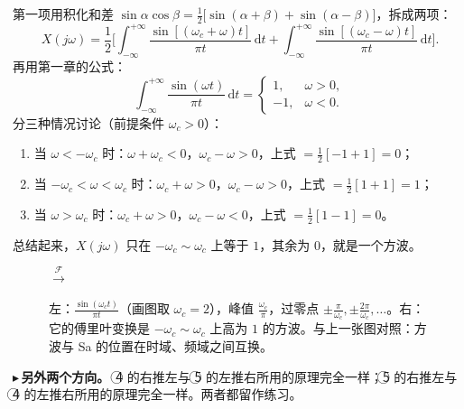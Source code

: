 \documentclass[UTF8,a4paper,11pt]{ctexart}
\newcommand{\dd}{\mathrm{d}}
\newcommand{\F}{\mathcal{F}}
\newcommand{\taxes}[5][t]{%
  \draw[->] (#2,0) -- (#3,0) node[right,font=\scriptsize] {$#1$};
  \draw[->] (0,#5) -- (0,#4);
  \node[anchor=north east,font=\tiny,gray!60!black,inner sep=1pt] at (0,-0.02) {$0$};}
\newcommand{\xt}[2]{\draw (#1,0) -- (#1,-0.1) node[anchor=north,font=\tiny,gray!60!black,fill=white,inner sep=0.6pt] {$#2$};}
\newcommand{\yt}[2]{\draw (0,#1) -- (-0.1,#1) node[anchor=east,font=\tiny,gray!60!black,fill=white,inner sep=0.6pt] {$#2$};}
\newcommand{\xtl}[3]{\draw (#1,0) -- (#1,-0.08); \draw[gray!55,densely dotted] (#1,-0.08) -- (#1,#3);
  \node[anchor=north,font=\tiny,gray!60!black,fill=white,inner sep=0.6pt] at (#1,#3) {$#2$};}
\newcounter{ex}[section]
\newcommand{\point}[1]{\par\addvspace{1ex}\noindent\textcolor{ptteal}{$\blacktriangleright$\,\textbf{#1}}\ }
\begin{document}
第一项用积化和差 $\sin\alpha\cos\beta=\frac12\big[\sin(\alpha+\beta)+\sin(\alpha-\beta)\big]$，拆成两项：
\[
X(j\omega)=\frac12\Big[\int_{-\infty}^{+\infty}\frac{\sin[(\omega_c+\omega)t]}{\pi t}\,\dd t+\int_{-\infty}^{+\infty}\frac{\sin[(\omega_c-\omega)t]}{\pi t}\,\dd t\Big].
\]
再用第一章的公式：
\[
\int_{-\infty}^{+\infty}\frac{\sin(\omega t)}{\pi t}\,\dd t=\begin{cases}1, & \omega>0,\\ -1, & \omega<0 .\end{cases}
\]
分三种情况讨论（前提条件 $\omega_c>0$）：
\begin{enumerate}[nosep,label=\textcircled{\scriptsize\arabic*}]
\item 当 $\omega<-\omega_c$ 时：$\omega+\omega_c<0$，$\omega_c-\omega>0$，上式 $=\frac12[-1+1]=0$；
\item 当 $-\omega_c<\omega<\omega_c$ 时：$\omega_c+\omega>0$，$\omega_c-\omega>0$，上式 $=\frac12[1+1]=1$；
\item 当 $\omega>\omega_c$ 时：$\omega_c+\omega>0$，$\omega_c-\omega<0$，上式 $=\frac12[1-1]=0$。
\end{enumerate}
总结起来，$X(j\omega)$ 只在 $-\omega_c\sim\omega_c$ 上等于 $1$，其余为 $0$，就是一个方波。

\begin{figure}[H]
\centering
{}
\quad$\xrightarrow{\ \F\ }$\quad
{}
\caption{左：$\frac{\sin(\omega_ct)}{\pi t}$（画图取 $\omega_c=2$），峰值 $\frac{\omega_c}\pi$，过零点 $\pm\frac{\pi}{\omega_c},\pm\frac{2\pi}{\omega_c},\dots$。右：它的傅里叶变换是 $-\omega_c\sim\omega_c$ 上高为 $1$ 的方波。与上一张图对照：方波与 Sa 的位置在时域、频域之间互换。}
\end{figure}

\point{另外两个方向。}\textcircled{\scriptsize 4} 的右推左与 \textcircled{\scriptsize 5} 的左推右所用的原理完全一样；\textcircled{\scriptsize 5} 的右推左与 \textcircled{\scriptsize 4} 的左推右所用的原理完全一样。两者都留作练习。
\end{document}
